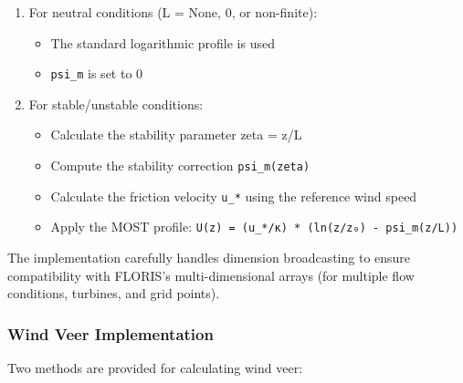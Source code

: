 \documentclass[
]{article}
\providecommand{\tightlist}{%
  \setlength{\itemsep}{0pt}\setlength{\parskip}{0pt}}
\begin{document}
\begin{enumerate}
\def\labelenumi{\arabic{enumi}.}
\tightlist
\item
  For neutral conditions (L = None, 0, or non-finite):

  \begin{itemize}
  \tightlist
  \item
    The standard logarithmic profile is used
  \item
    \texttt{psi\_m} is set to 0
  \end{itemize}
\item
  For stable/unstable conditions:

  \begin{itemize}
  \tightlist
  \item
    Calculate the stability parameter zeta = z/L
  \item
    Compute the stability correction \texttt{psi\_m(zeta)}
  \item
    Calculate the friction velocity \texttt{u\_*} using the reference
    wind speed
  \item
    Apply the MOST profile:
    \texttt{U(z)\ =\ (u\_*/κ)\ *\ (ln(z/z₀)\ -\ psi\_m(z/L))}
  \end{itemize}
\end{enumerate}

The implementation carefully handles dimension broadcasting to ensure
compatibility with FLORIS's multi-dimensional arrays (for multiple flow
conditions, turbines, and grid points).

\hypertarget{wind-veer-implementation}{%
\subsubsection{Wind Veer
Implementation}\label{wind-veer-implementation}}

Two methods are provided for calculating wind veer:
\end{document}
